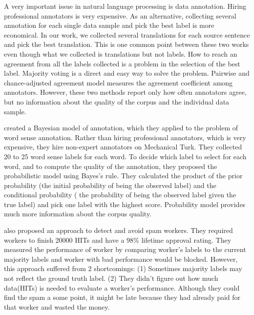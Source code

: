 \documentclass[11pt]{article}
\begin{document}

A very important issue in natural language processing is data annotation. Hiring professional annotators is very expensive. As an alternative, collecting several annotation for each single data sample and pick the best label is  more economical.  In our work, we collected several translations for each source sentence and pick the best translation. This is one common point between these two works even though what we collected is translations but not labels.  How to reach an agreement from all the labels collected is a problem in the selection of the best label. Majority voting is a direct and easy way to solve the problem.  
Pairwise and chance-adjusted agreement model measures the agreement coefficient among annotators. However, these two methods report only how often annotators agree, but no information about the quality of the corpus and the individual data sample.

 created a Bayesian model of annotation, which they applied to the problem of word sense annotation. Rather than hiring professional annotators, which is very expensive, they hire non-expert annotators on Mechanical Turk.  They collected 20 to 25 word sense labels for each word. To decide which label to select for each word, and to compute the quality of the annotation, they proposed the probabilistic model using Bayes's rule. They calculated the product of the prior probability (the initial probability of being the observed label) and the conditional probability ( the probability of being the observed label given the true label) and pick one label with the highest score. Probability model provides much more information about the corpus quality. 

 also proposed an approach to detect and avoid spam workers. They required workers to finish 20000 HITs and have a 98\% lifetime approval rating. They measured the performance of worker by comparing worker's labels to the current majority labels and worker with bad performance would be blocked. However, this approach suffered from 2 shortcomings: (1) Sometimes majority labels may not reflect the ground truth label. (2) They didn't figure out  how much data(HITs) is needed to evaluate a worker's performance. Although they could find the spam a some point, it might be late because they had already paid for that worker and wasted the money.



\end{document}
